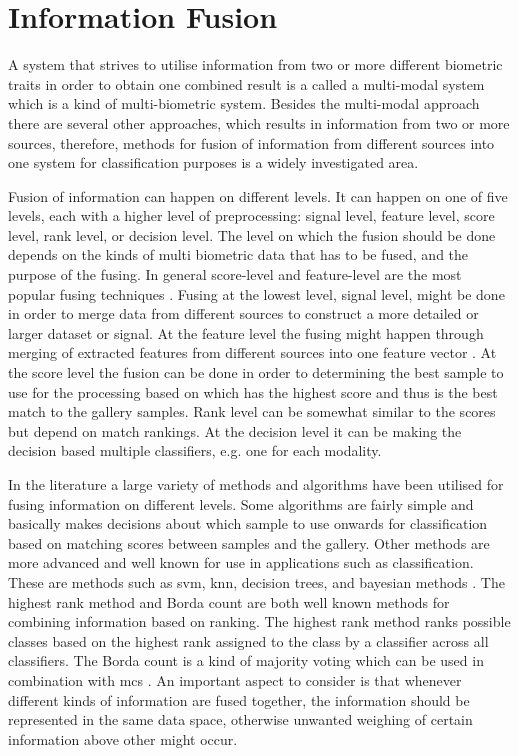 \section{Information Fusion}
\label{sec:info_fuse}

A system that strives to utilise information from two or more different biometric traits in order to obtain one combined result is a called a multi-modal system which is a kind of multi-biometric system. Besides the multi-modal approach there are several other approaches, which results in information from two or more sources, therefore, methods for fusion of information from different sources into one system for classification purposes is a widely investigated area. \citep{Bowyer2016b}

Fusion of information can happen on different levels. It can happen on one of five levels, each with a higher level of preprocessing: signal level, feature level, score level, rank level, or decision level. The level on which the fusion should be done depends on the kinds of multi biometric data that has to be fused, and the purpose of the fusing. In general score-level and feature-level are the most popular fusing techniques \citep{Bowyer2016b}. Fusing at the lowest level, signal level, might be done in order to merge data from different sources to construct a more detailed or larger dataset or signal. At the feature level the fusing might happen through merging of extracted features from different sources into one feature vector \citep{Ross2003}. At the score level the fusion can be done in order to determining the best sample to use for the processing based on which has the highest score and thus is the best match to the gallery samples. Rank level can be somewhat similar to the scores but depend on match rankings. At the decision level it can be making the decision based multiple classifiers, e.g. one for each modality\citep{Fierrez2018b}.

In the literature a large variety of methods and algorithms have been utilised for fusing information on different levels. Some algorithms are fairly simple and basically makes decisions about which sample to use onwards for classification based on matching scores between samples and the gallery. Other methods are more advanced and well known for use in applications such as classification. These are methods such as \gls{svm}, \gls{knn}, decision trees, and bayesian methods \citep{Ross2003}. The highest rank method and Borda count are both well known methods for combining information based on ranking. The highest rank method ranks possible classes based on the highest rank assigned to the class by a classifier across all classifiers.\citep{Ho1994} The Borda count is a kind of majority voting which can be used in combination with \gls{mcs} \citep{Bowyer2016b,Ho1994}. An important aspect to consider is that whenever  different kinds of information are fused together, the information should be represented in the same data space, otherwise unwanted weighing of certain information above other might occur.  

